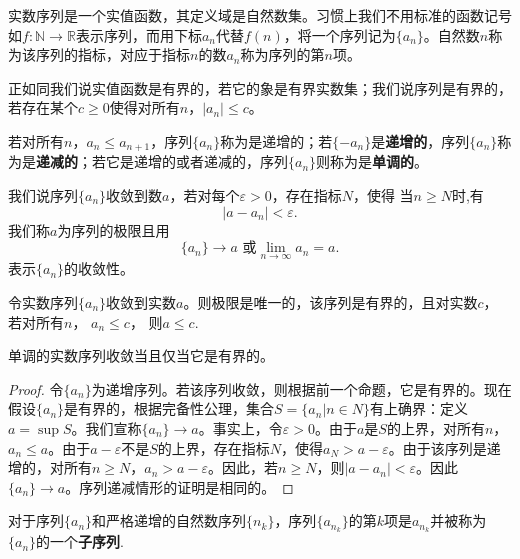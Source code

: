 \documentclass[lang=cn,newtx,10pt,scheme=chinese]{../Template/elegantbook}
\begin{document}
\begin{definition}\label{definition:实数序列/实数列}
  实数序列是一个实值函数，其定义域是自然数集。习惯上我们不用标准的函数记号如\(f:\mathbb{N}\to\mathbb{R}\)表示序列，而用下标\(a_n\)代替\(f(n)\)，将一个序列记为\(\{a_n\}\)。自然数\(n\)称为该序列的指标，对应于指标\(n\)的数\(a_n\)称为序列的第\(n\)项。
  
  正如同我们说实值函数是有界的，若它的象是有界实数集；我们说序列是有界的，若存在某个\(c\geqslant0\)使得对所有\(n\)，\(\vert a_n\vert\leqslant c\)。
  
  若对所有\(n\)，\(a_n\leqslant a_{n + 1}\)，序列\(\{a_n\}\)称为是递增的；若\(\{-a_n\}\)是\textbf{递增的}，序列\(\{a_n\}\)称为是\textbf{递减的}；若它是递增的或者递减的，序列\(\{a_n\}\)则称为是\textbf{单调的}。
\end{definition}

\begin{definition}
  我们说序列\(\{a_n\}\)收敛到数\(a\)，若对每个\(\varepsilon>0\)，存在指标\(N\)，使得
当\(n\geqslant N\)时,有\[\vert a - a_n\vert<\varepsilon.\]
我们称\(a\)为序列的极限且用
\[\{a_n\}\to a\text{ 或}\lim_{n\to\infty}a_n = a.\]
表示\(\{a_n\}\)的收敛性。
\end{definition}

\begin{proposition}[收敛的实数列的性质]\label{proposition:收敛的实数列的性质}
  令实数序列\(\{a_n\}\)收敛到实数\(a\)。则极限是唯一的，该序列是有界的，且对实数\(c\)，
若对所有\(n\)， \(a_n\leqslant c\)， 则\(a\leqslant c\).
\end{proposition}

\begin{theorem}[实数序列的单调收敛准则]\label{theorem:实数序列的单调收敛准则}
单调的实数序列收敛当且仅当它是有界的。
\end{theorem}
\begin{proof}
  令\(\{a_n\}\)为递增序列。若该序列收敛，则根据前一个命题，它是有界的。现在假设\(\{a_n\}\)是有界的，根据完备性公理，集合\(S = \{a_n|n\in N\}\)有上确界：定义\(a = \sup S\)。我们宣称\(\{a_n\}\to a\)。事实上，令\(\varepsilon>0\)。由于\(a\)是\(S\)的上界，对所有\(n\)，\(a_n\leqslant a\)。由于\(a - \varepsilon\)不是\(S\)的上界，存在指标\(N\)，使得\(a_N>a - \varepsilon\)。由于该序列是递增的，对所有\(n\geqslant N\)，\(a_n>a - \varepsilon\)。因此，若\(n\geqslant N\)，则\(\vert a - a_n\vert<\varepsilon\)。因此\(\{a_n\}\to a\)。序列递减情形的证明是相同的。
\end{proof}

\begin{definition}[子序列]\label{definition:子序列}
  对于序列\(\{a_n\}\)和严格递增的自然数序列\(\{n_k\}\)，序列\(\{a_{n_k}\}\)的第\(k\)项是\(a_{n_k}\)并被称为\(\{a_n\}\)的一个\textbf{子序列}.
\end{definition}
\end{document}
